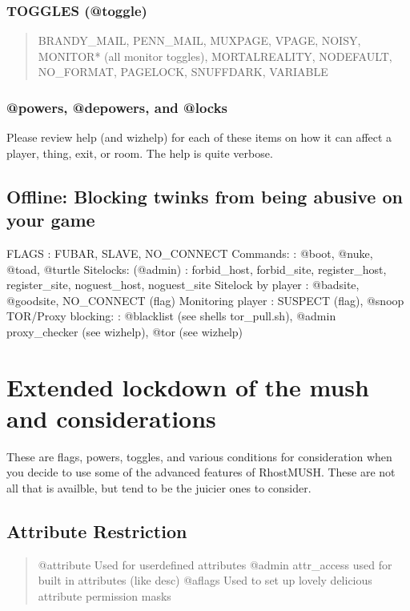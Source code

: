 \documentclass[letterpaper,10pt,english]{sphinxmanual}
\begin{document}
\subsubsection{TOGGLES (@toggle)}
\label{\detokenize{security:toggles-toggle}}\begin{quote}

\sphinxAtStartPar
BRANDY\_MAIL, PENN\_MAIL, MUXPAGE, VPAGE, NOISY,
MONITOR* (all monitor toggles), MORTALREALITY,
NODEFAULT, NO\_FORMAT, PAGELOCK, SNUFFDARK, VARIABLE
\end{quote}


\subsubsection{@powers, @depowers, and @locks}
\label{\detokenize{security:powers-depowers-and-locks}}
\sphinxAtStartPar
Please review help (and wizhelp) for each of these items on how it can affect
a player, thing, exit, or room.  The help is quite verbose.


\subsection{Offline: Blocking twinks from being abusive on your game}
\label{\detokenize{security:offline-blocking-twinks-from-being-abusive-on-your-game}}
\sphinxAtStartPar
FLAGS                   : FUBAR, SLAVE, NO\_CONNECT
Commands:               : @boot, @nuke, @toad, @turtle
Sitelocks: (@admin)     : forbid\_host, forbid\_site, register\_host, register\_site, noguest\_host, noguest\_site
Sitelock by player      : @badsite, @goodsite, NO\_CONNECT (flag)
Monitoring player       : SUSPECT (flag), @snoop
TOR/Proxy blocking:     : @blacklist (see shell\textquotesingle{}s tor\_pull.sh), @admin proxy\_checker (see wizhelp), @tor (see wizhelp)


\section{Extended lockdown of the mush and considerations}
\label{\detokenize{security:extended-lockdown-of-the-mush-and-considerations}}
\sphinxAtStartPar
These are flags, powers, toggles, and various conditions for consideration
when you decide to use some of the advanced features of RhostMUSH.
These are not all that is availble, but tend to be the juicier ones to consider.


\subsection{Attribute Restriction}
\label{\detokenize{security:attribute-restriction}}\begin{quote}

\sphinxAtStartPar
@attribute \sphinxhyphen{}\sphinxhyphen{} Used for user\sphinxhyphen{}defined attributes
@admin attr\_access \sphinxhyphen{}\sphinxhyphen{} used for built in attributes (like desc)
@aflags \sphinxhyphen{}\sphinxhyphen{} Used to set up lovely delicious attribute permission masks
\end{quote}
\end{document}
